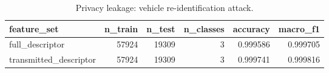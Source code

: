 \begin{table}[t]
\centering
\begin{tabular}{lrrrrr}
\toprule
feature\_set & n\_train & n\_test & n\_classes & accuracy & macro\_f1 \\
\midrule
full\_descriptor & 57924 & 19309 & 3 & 0.999586 & 0.999705 \\
transmitted\_descriptor & 57924 & 19309 & 3 & 0.999741 & 0.999816 \\
\bottomrule
\end{tabular}
\caption{Privacy leakage: vehicle re-identification attack.}
\label{tab:privacy-reid}
\end{table}
